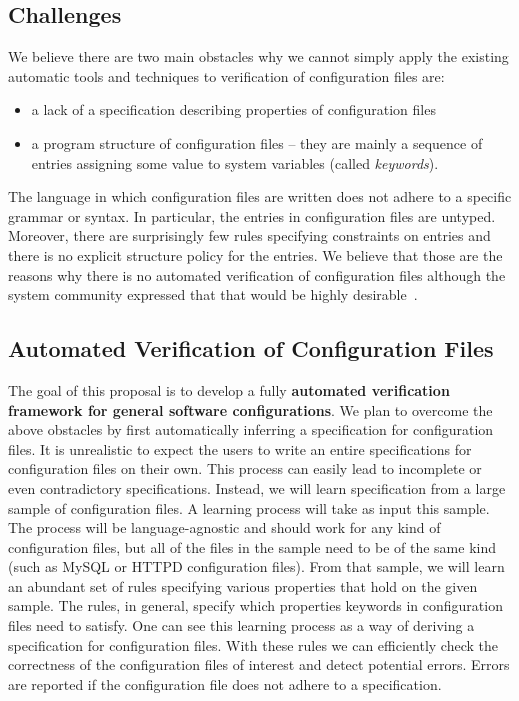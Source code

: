 \subsection{Challenges}
\label{sec:intro-chal}

We believe there are two main obstacles 
why we cannot simply apply the existing automatic 
tools and techniques to verification of configuration files are:
\begin{itemize}
\item a lack
of a specification describing properties of configuration files
\item a program structure of configuration files -- they
are mainly a sequence of entries assigning some value to system
variables (called {\emph {keywords}}). 
\end{itemize}
The language in which configuration files are written does 
not adhere to a specific grammar or syntax. In particular, the
entries in configuration files are untyped. Moreover, there are surprisingly few rules specifying constraints on entries and there
is no explicit structure policy for the entries.
We believe that those are the reasons why there is no automated verification of configuration 
files although the system community expressed that that would be highly
desirable~\cite{wang04automatic, zhang14encore, xu15systems}.


\subsection{Automated Verification of Configuration Files}
\label{sec:intro-goal}

The goal of this proposal is to develop a fully {\bf {automated 
verification  framework for general software configurations}}. We plan to
overcome the above obstacles by first automatically inferring a
specification for configuration files. It is unrealistic to expect the 
users to write an entire specifications for configuration files on their own. 
This process can easily lead to incomplete or even contradictory 
specifications. Instead, we will learn specification from 
a large sample of 
configuration files. A learning process will take as input this 
sample. The process will be language-agnostic and should work for any kind 
of configuration files,  but all of the files in the sample need to be of 
the same kind (such as MySQL or 
HTTPD configuration files). From that sample, we will learn an abundant set of rules 
specifying various properties that hold on the given sample. The rules, in general, 
specify which properties keywords in configuration files need to satisfy. One can see this learning process as 
a way of deriving  a specification for configuration files. With these  rules we can efficiently check 
the correctness of the configuration files of interest and detect 
potential errors. Errors are reported if the configuration file does not 
adhere to a specification.

